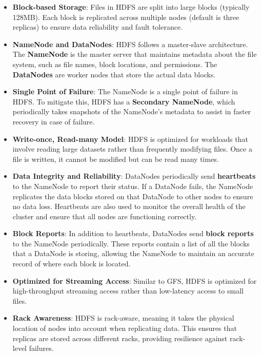 \documentclass[12pt]{article}
\begin{document}
\begin{itemize}
    \item \textbf{Block-based Storage}: Files in HDFS are split into large blocks (typically 128MB). Each block is replicated across multiple nodes (default is three replicas) to ensure data reliability and fault tolerance.
    
    \item \textbf{NameNode and DataNodes}: HDFS follows a master-slave architecture. The \textbf{NameNode} is the master server that maintains metadata about the file system, such as file names, block locations, and permissions. The \textbf{DataNodes} are worker nodes that store the actual data blocks.
    
    \item \textbf{Single Point of Failure}: The NameNode is a single point of failure in HDFS. To mitigate this, HDFS has a \textbf{Secondary NameNode}, which periodically takes snapshots of the NameNode's metadata to assist in faster recovery in case of failure.
    
    \item \textbf{Write-once, Read-many Model}: HDFS is optimized for workloads that involve reading large datasets rather than frequently modifying files. Once a file is written, it cannot be modified but can be read many times.
    
    \item \textbf{Data Integrity and Reliability}: DataNodes periodically send 	\textbf{heartbeats} to the NameNode to report their status. If a DataNode fails, the NameNode replicates the data blocks stored on that DataNode to other nodes to ensure no data loss. Heartbeats are also used to monitor the overall health of the cluster and ensure that all nodes are functioning correctly.

    \item \textbf{Block Reports}: In addition to heartbeats, DataNodes send 	\textbf{block reports} to the NameNode periodically. These reports contain a list of all the blocks that a DataNode is storing, allowing the NameNode to maintain an accurate record of where each block is located.

    \item \textbf{Optimized for Streaming Access}: Similar to GFS, HDFS is optimized for high-throughput streaming access rather than low-latency access to small files.
    
    \item \textbf{Rack Awareness}: HDFS is rack-aware, meaning it takes the physical location of nodes into account when replicating data. This ensures that replicas are stored across different racks, providing resilience against rack-level failures.
\end{itemize}
\end{document}
